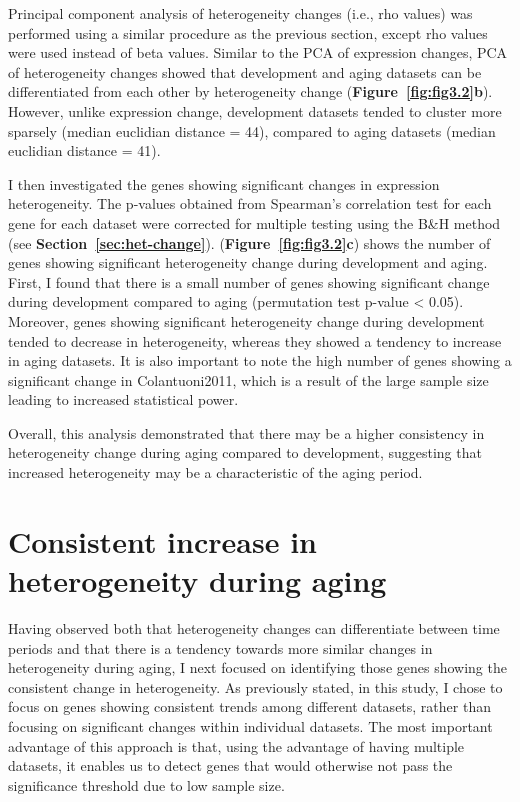 Principal component analysis of heterogeneity changes (i.e., rho values) was performed using a similar procedure as the previous section, 
except rho values were used instead of beta values. 
Similar to the PCA of expression changes, PCA of heterogeneity changes showed that development and aging datasets can be differentiated from each other by heterogeneity change (\textbf{Figure~\ref{fig:fig3.2}b}).
However, unlike expression change, development datasets tended to cluster more sparsely (median euclidian distance = 44), compared to aging datasets (median euclidian distance = 41).

I then investigated the genes showing significant changes in expression heterogeneity. 
The p-values obtained from Spearman's correlation test for each gene for each dataset were corrected for multiple testing using the B{\&}H method (see \textbf{Section~\ref{sec:het-change}}).
(\textbf{Figure~\ref{fig:fig3.2}c}) shows the number of genes showing significant heterogeneity change during development and aging.
First, I found that there is a small number of genes showing significant change during development compared to aging (permutation test p-value < 0.05).
Moreover, genes showing significant heterogeneity change during development tended to decrease in heterogeneity, whereas they showed a tendency to increase in aging datasets.
It is also important to note the high number of genes showing a significant change in Colantuoni2011, which is a result of the large sample size leading to increased statistical power.

Overall, this analysis demonstrated that there may be a higher consistency in heterogeneity change during aging compared to development, 
suggesting that increased heterogeneity may be a characteristic of the aging period.

\section{Consistent increase in heterogeneity during aging}
Having observed both that heterogeneity changes can differentiate between time periods and that there is a tendency towards more similar changes in heterogeneity during aging,
I next focused on identifying those genes showing the consistent change in heterogeneity.
As previously stated, in this study, I chose to focus on genes showing consistent trends among different datasets, rather than focusing on significant changes within individual datasets.
The most important advantage of this approach is that, using the advantage of having multiple datasets, 
it enables us to detect genes that would otherwise not pass the significance threshold due to low sample size.

